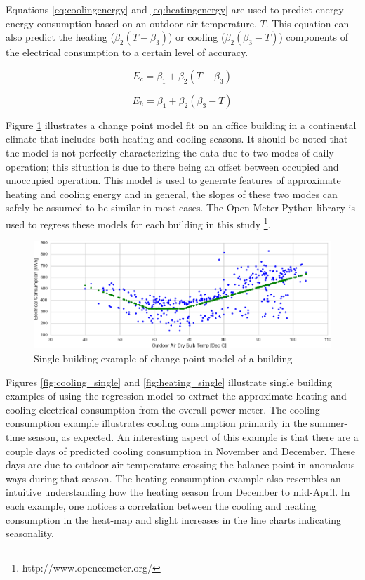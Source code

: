 Equations \ref{eq:coolingenergy} and \ref{eq:heatingenergy} are used to predict energy energy consumption based on an outdoor air temperature, $T$. This equation can also predict the heating ($\beta_2(T - \beta_3)$) or cooling ($\beta_2(\beta_3 - T)$) components of the electrical consumption to a certain level of accuracy. 

\begin{equation}
\label{eq:coolingenergy}
E_c = \beta_1 + \beta_2(T - \beta_3)
\end{equation}

\begin{equation}
\label{eq:heatingenergy}
E_h = \beta_1 + \beta_2(\beta_3 - T)
\end{equation}

Figure \ref{fig:changepoint} illustrates a change point model fit on an office building in a continental climate that includes both heating and cooling seasons. It should be noted that the model is not perfectly characterizing the data due to two modes of daily operation; this situation is due to there being an offset between occupied and unoccupied operation. This model is used to generate features of approximate heating and cooling energy and in general, the slopes of these two modes can safely be assumed to be similar in most cases. The Open Meter Python library is used to regress these models for each building in this study \footnote{http://www.openeemeter.org/}.

\begin{figure}[ht!]
\begin{center}
\includegraphics[width=1\columnwidth]{figures/Changepointmodelexample/Changepointmodelexample}
\caption{Single building example of change point model of a building
\label{fig:changepoint}%
}
\end{center}
\end{figure}

Figures \ref{fig:cooling_single} and \ref{fig:heating_single} illustrate single building examples of using the regression model to extract the approximate heating and cooling electrical consumption from the overall power meter. The cooling consumption example illustrates cooling consumption primarily in the summer-time season, as expected. An interesting aspect of this example is that there are a couple days of predicted cooling consumption in November and December. These days are due to outdoor air temperature crossing the balance point in anomalous ways during that season. The heating consumption example also resembles an intuitive understanding how the heating season from December to mid-April. In each example, one notices a correlation between the cooling and heating consumption in the heat-map and slight increases in the line charts indicating seasonality. 


